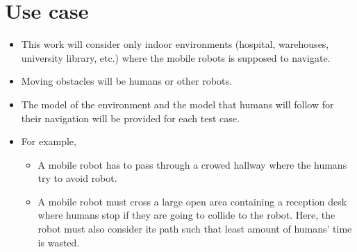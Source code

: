 \documentclass[rnd]{mas_proposal}
\begin{document}
\section{Use case}
\begin{itemize}
    \item This work will consider only indoor environments (hospital, warehouses, university library, etc.) where the mobile robots is supposed to navigate.
    \item Moving obstacles will be humans or other robots.
    \item The model of the environment and the model that humans will follow for their navigation will be provided for each test case.
    \item For example,
        \begin{itemize}
            \item A mobile robot has to pass through a crowed hallway where the humans try to avoid robot.
            \item A mobile robot must cross a large open area containing a reception desk where humans stop if they are going to collide to the robot. Here, the robot must also consider its path such that least amount of humans' time is wasted.
        \end{itemize} 
\end{itemize}
\end{document}
